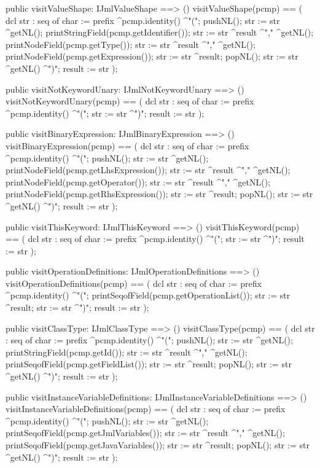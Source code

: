 \begin{vdm_al}
  public visitValueShape: IJmlValueShape ==> ()
  visitValueShape(pcmp) ==
    ( dcl str : seq of char := prefix ^pcmp.identity() ^"(";
      pushNL();
      str := str ^getNL();
      printStringField(pcmp.getIdentifier());
      str := str ^result ^"," ^getNL();
      printNodeField(pcmp.getType());
      str := str ^result ^"," ^getNL();
      printNodeField(pcmp.getExpression());
      str := str ^result;
      popNL();
      str := str ^getNL() ^")";
      result := str );

  public visitNotKeywordUnary: IJmlNotKeywordUnary ==> ()
  visitNotKeywordUnary(pcmp) ==
    ( dcl str : seq of char := prefix ^pcmp.identity() ^"(";
      str := str ^")";
      result := str );

  public visitBinaryExpression: IJmlBinaryExpression ==> ()
  visitBinaryExpression(pcmp) ==
    ( dcl str : seq of char := prefix ^pcmp.identity() ^"(";
      pushNL();
      str := str ^getNL();
      printNodeField(pcmp.getLhsExpression());
      str := str ^result ^"," ^getNL();
      printNodeField(pcmp.getOperator());
      str := str ^result ^"," ^getNL();
      printNodeField(pcmp.getRhsExpression());
      str := str ^result;
      popNL();
      str := str ^getNL() ^")";
      result := str );

  public visitThisKeyword: IJmlThisKeyword ==> ()
  visitThisKeyword(pcmp) ==
    ( dcl str : seq of char := prefix ^pcmp.identity() ^"(";
      str := str ^")";
      result := str );

  public visitOperationDefinitions: IJmlOperationDefinitions ==> ()
  visitOperationDefinitions(pcmp) ==
    ( dcl str : seq of char := prefix ^pcmp.identity() ^"(";
      printSeqofField(pcmp.getOperationList());
      str := str ^result;
      str := str ^")";
      result := str );

  public visitClassType: IJmlClassType ==> ()
  visitClassType(pcmp) ==
    ( dcl str : seq of char := prefix ^pcmp.identity() ^"(";
      pushNL();
      str := str ^getNL();
      printStringField(pcmp.getId());
      str := str ^result ^"," ^getNL();
      printSeqofField(pcmp.getFieldList());
      str := str ^result;
      popNL();
      str := str ^getNL() ^")";
      result := str );

  public visitInstanceVariableDefinitions: IJmlInstanceVariableDefinitions ==> ()
  visitInstanceVariableDefinitions(pcmp) ==
    ( dcl str : seq of char := prefix ^pcmp.identity() ^"(";
      pushNL();
      str := str ^getNL();
      printSeqofField(pcmp.getJmlVariables());
      str := str ^result ^"," ^getNL();
      printSeqofField(pcmp.getJavaVariables());
      str := str ^result;
      popNL();
      str := str ^getNL() ^")";
      result := str );


\end{vdm_al}

